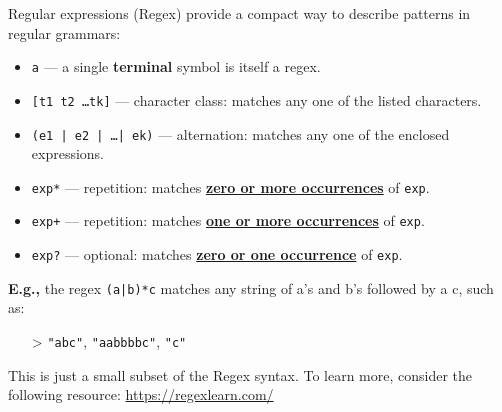 \begin{Def}

    \label{def:regex}
    Regular expressions (Regex) provide a compact way to describe patterns in regular grammars:
    
    \begin{itemize}
        \item \texttt{a} — a single \textbf{terminal} symbol is itself a regex.
       
    
        \item \texttt{[t1 t2 \ldots tk]} — character class: matches any one of the listed characters.
        
    
        \item \texttt{(e1 | e2 | \ldots | ek)} — alternation: matches any one of the enclosed expressions.
       
    
        \item \texttt{exp*} — repetition: matches \underline{\textbf{zero or more occurrences}} of \texttt{exp}.
      
    
        \item \texttt{exp+} — repetition: matches \underline{\textbf{one or more occurrences}} of \texttt{exp}.
        
    
        \item \texttt{exp?} — optional: matches \underline{\textbf{zero or one occurrence}} of \texttt{exp}.
        
    \end{itemize}
    
    \noindent
    \textbf{E.g.,} the regex \texttt{(a|b)*c} matches any string of a's and b's followed by a c, such as:
    \begin{itemize}
        \item[>] \texttt{"abc"}, \texttt{"aabbbbc"}, \texttt{"c"}
    \end{itemize}
   
    \noindent
    This is just a small subset of the Regex syntax. To learn more, consider the following resource:
    \url{https://regexlearn.com/}
    \end{Def}
    